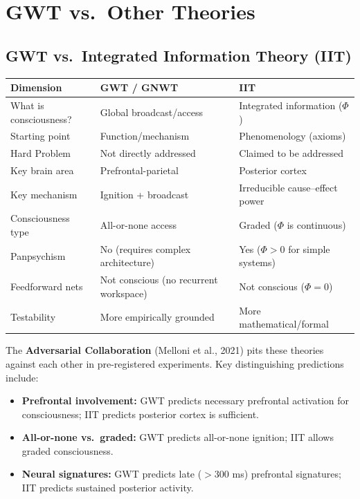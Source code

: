 \documentclass[11pt,a4paper]{report}
\begin{document}
\chapter{GWT vs.\ Other Theories}

\section{GWT vs.\ Integrated Information Theory (IIT)}

\begin{compbox}
\renewcommand{\arraystretch}{1.4}
\begin{tabular}{>{\raggedright}p{3cm} >{\raggedright}p{5cm} >{\raggedright\arraybackslash}p{5cm}}
  \toprule
  \textbf{Dimension} & \textbf{GWT / GNWT} & \textbf{IIT} \\
  \midrule
  What is consciousness? & Global broadcast/access & Integrated information ($\Phi$) \\
  Starting point & Function/mechanism & Phenomenology (axioms) \\
  Hard Problem & Not directly addressed & Claimed to be addressed \\
  Key brain area & Prefrontal-parietal & Posterior cortex \\
  Key mechanism & Ignition + broadcast & Irreducible cause--effect power \\
  Consciousness type & All-or-none access & Graded ($\Phi$ is continuous) \\
  Panpsychism & No (requires complex architecture) & Yes ($\Phi > 0$ for simple systems) \\
  Feedforward nets & Not conscious (no recurrent workspace) & Not conscious ($\Phi = 0$) \\
  Testability & More empirically grounded & More mathematical/formal \\
  \bottomrule
\end{tabular}
\end{compbox}

The \textbf{Adversarial Collaboration} (Melloni et al., 2021) pits these theories against each other in pre-registered experiments. Key distinguishing predictions include:
\begin{itemize}[leftmargin=1.5em]
  \item \textbf{Prefrontal involvement:} GWT predicts necessary prefrontal activation for consciousness; IIT predicts posterior cortex is sufficient.
  \item \textbf{All-or-none vs.\ graded:} GWT predicts all-or-none ignition; IIT allows graded consciousness.
  \item \textbf{Neural signatures:} GWT predicts late ($>$300 ms) prefrontal signatures; IIT predicts sustained posterior activity.
\end{itemize}
\end{document}
